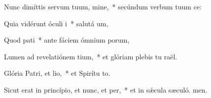\item Nunc dimíttis servum tuum, mine,~* secúndum verbum tuum  ce:
\item Quia vidérunt óculi i~* salutá um,
\item Quod pati~* ante fáciem ómnium porum,
\item Lumen ad revelatiónem tium,~* et glóriam plebis tu raël.
\item Glória Patri, et lio,~* et Spirítu to.
\item Sicut erat in princípio, et nunc, et per,~* et in sǽcula sæculó. men.
